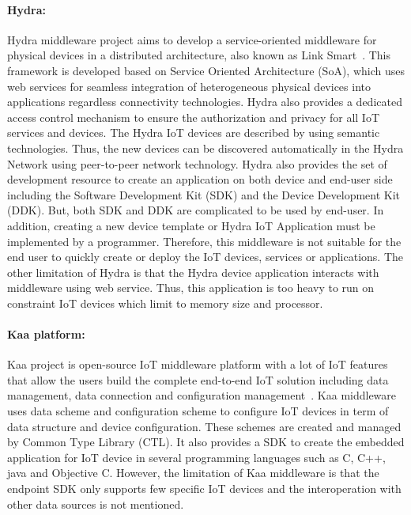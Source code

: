 \paragraph{Hydra:}
Hydra middleware project aims to develop a service-oriented middleware for physical devices in a distributed architecture, also known as Link Smart~\cite{eisenhauer2009development}. This framework is developed based on Service Oriented Architecture (SoA), which uses web services for seamless integration of heterogeneous physical devices into applications regardless connectivity technologies. Hydra also provides a dedicated access control mechanism to ensure the authorization and privacy for all IoT services and devices. The Hydra IoT devices are described by using semantic technologies. Thus, the new devices can be discovered automatically in the Hydra Network using peer-to-peer network technology. Hydra also provides the set of development resource to create an application on both device and end-user side including the Software Development Kit (SDK) and the Device Development Kit (DDK). But, both SDK and DDK are complicated to be used by end-user. In addition, creating a new device template or Hydra IoT Application must be implemented by a programmer. Therefore, this middleware is not suitable for the end user to quickly create or deploy the IoT devices, services or applications. The other limitation of Hydra is that the Hydra device application interacts with middleware using web service. Thus, this application is too heavy to run on constraint IoT devices which limit to memory size and processor.

\paragraph{Kaa platform:}
Kaa project is open-source IoT middleware platform with a lot of IoT features that allow the users build the complete end-to-end IoT solution including data management, data connection and configuration management~\cite{kaa_project}. Kaa middleware uses data scheme and configuration scheme to configure IoT devices in term of data structure and device configuration. These schemes are created and managed by Common Type Library (CTL). It also provides a SDK to create the embedded application for IoT device in several programming languages such as C, C++, java and Objective C. However, the limitation of Kaa middleware is that the endpoint SDK only supports few specific IoT devices and the interoperation with other data sources is not mentioned.

